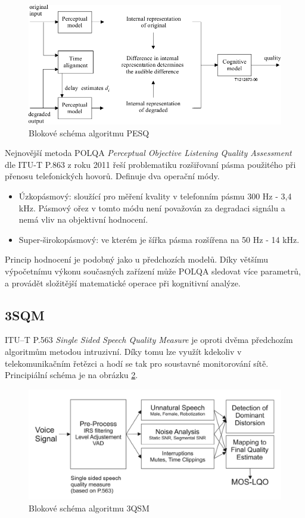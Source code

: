    \begin{figure}[h]
        \centering
        \includegraphics[width = .7\textwidth]{pic/PESQ.pdf}
        \caption{Blokové schéma algoritmu PESQ}
        \label{pic:pesq}
    \end{figure}
  
    
    Nejnovější metoda POLQA \textit{Perceptual Objective Listening Quality Assessment} dle ITU-T  P.863 z roku 2011 \cite{itut:863} řeší problematiku rozšiřovaní pásma použitého při přenosu telefonických hovorů. Definuje dva operační módy.
    \begin{itemize}
        \item Úzkopásmový: sloužící pro měření kvality v telefonním pásmu 300 Hz - 3,4 kHz. Pásmový ořez v tomto módu není považován za degradaci signálu a nemá vliv na objektivní hodnocení.
        \item Super-širokopásmový: ve kterém je šířka pásma rozšířena na 50 Hz - 14 kHz.
    \end{itemize}
    
    Princip hodnocení je podobný jako u předchozích modelů. Díky většímu výpočetnímu výkonu současných zařízení může POLQA sledovat více parametrů, a provádět složitější matematické operace při kognitivní analýze.
    
\subsection{3SQM}
    
    ITU–T P.563 \textit{Single Sided Speech Quality Measure} \cite{itut:536} je oproti dvěma předchozím algoritmům metodou intruzivní. Díky tomu lze využít kdekoliv v telekomunikačním řetězci a hodí se tak pro soustavné monitorování sítě. Principiální schéma je na obrázku \ref{pic:3sqm}.
    
    \begin{figure}[h]
        \centering
        \includegraphics[width = .6\textwidth]{pic/3sqm.png}
        \caption{Blokové schéma algoritmu 3QSM}
        \label{pic:3sqm}
    \end{figure}

